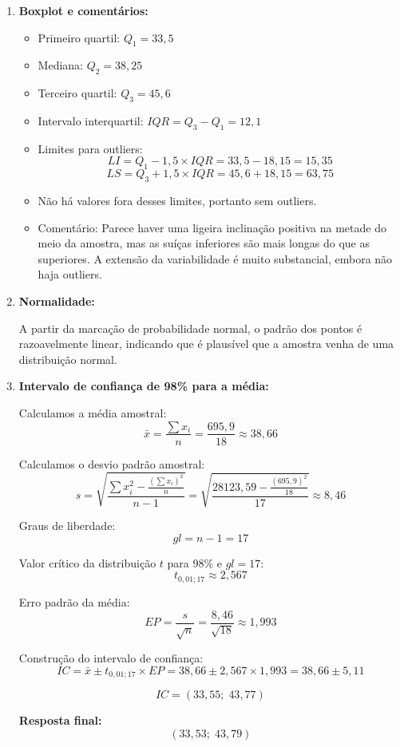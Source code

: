 \documentclass[12pt]{article}
\begin{document}
\begin{enumerate}
    \item \textbf{Boxplot e comentários:}
    
    \begin{itemize}
        \item Primeiro quartil: $Q_1 = 33,5$
        \item Mediana: $Q_2 = 38,25$
        \item Terceiro quartil: $Q_3 = 45,6$
        \item Intervalo interquartil: $IQR = Q_3 - Q_1 = 12,1$
        \item Limites para outliers:
        \[
        LI = Q_1 - 1,5 \times IQR = 33,5 - 18,15 = 15,35
        \]
        \[
        LS = Q_3 + 1,5 \times IQR = 45,6 + 18,15 = 63,75
        \]
        \item Não há valores fora desses limites, portanto sem outliers.
        \item Comentário: Parece haver uma ligeira inclinação positiva na metade do meio da amostra, mas as suíças inferiores são mais longas do que as superiores. A extensão da variabilidade é muito substancial, embora não haja outliers.
    \end{itemize}
    
    \item \textbf{Normalidade:}
    
    A partir da marcação de probabilidade normal, o padrão dos pontos é razoavelmente linear, indicando que é plausível que a amostra venha de uma distribuição normal.
    
    \item \textbf{Intervalo de confiança de 98\% para a média:}
    
    Calculamos a média amostral:
    \[
    \bar{x} = \frac{\sum x_i}{n} = \frac{695,9}{18} \approx 38,66
    \]
    
    Calculamos o desvio padrão amostral:
    \[
    s = \sqrt{\frac{\sum x_i^2 - \frac{\left(\sum x_i\right)^2}{n}}{n-1}} = \sqrt{\frac{28123,59 - \frac{(695,9)^2}{18}}{17}} \approx 8,46
    \]
    
    Graus de liberdade:
    \[
    gl = n - 1 = 17
    \]
    
    Valor crítico da distribuição $t$ para 98\% e $gl=17$:
    \[
    t_{0,01;17} \approx 2,567
    \]
    
    Erro padrão da média:
    \[
    EP = \frac{s}{\sqrt{n}} = \frac{8,46}{\sqrt{18}} \approx 1,993
    \]
    
    Construção do intervalo de confiança:
    \[
    IC = \bar{x} \pm t_{0,01;17} \times EP = 38,66 \pm 2,567 \times 1,993 = 38,66 \pm 5,11
    \]
    
    \[
    IC = (33,55; \; 43,77)
    \]
    
    \textbf{Resposta final:}
    \[
    (33,53; \; 43,79)
    \]
    
\end{enumerate}
\end{document}
